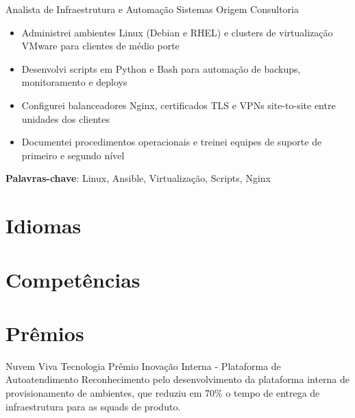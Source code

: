 \documentclass[a4paper, serif, 10pt]{moderncv}
\begin{document}
        {Analista de Infraestrutura e Automação}
        {Sistemas Origem Consultoria}
        {}
        {}
        {\begin{itemize}
\item Administrei ambientes Linux (Debian e RHEL) e clusters de virtualização VMware para clientes de médio porte
\item Desenvolvi scripts em Python e Bash para automação de backups, monitoramento e deploys
\item Configurei balanceadores Nginx, certificados TLS e VPNs site-to-site entre unidades dos clientes
\item Documentei procedimentos operacionais e treinei equipes de suporte de primeiro e segundo nível
\end{itemize}
\textbf{Palavras-chave}: Linux, Ansible, Virtualização, Scripts, Nginx}
\section{Idiomas}

\section{Competências}

\section{Prêmios}

        {Nuvem Viva Tecnologia}
        {Prêmio Inovação Interna - Plataforma de Autoatendimento}
        {}
        {}
        {Reconhecimento pelo desenvolvimento da plataforma interna de provisionamento de ambientes, que reduziu em 70\% o tempo de entrega de infraestrutura para as squads de produto.}
\end{document}
